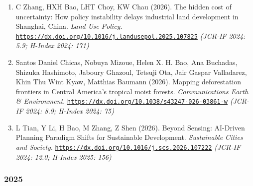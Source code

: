 \documentclass[10pt,a4paper]{article}
\begin{document}
\begin{enumerate}
  the Yangtze River Delta. \emph{Journal of Transport Geography}.
  \href{https://dx.doi.org/10.1016/j.jtrangeo.2026.104713}{\nolinkurl{https://dx.doi.org/10.1016/j.jtrangeo.2026.104713}}
  \emph{(JCR-IF 2024: 6.3; H-Index 2024: 165)}
\item
  C Zhang, HXH Bao, LHT Choy, KW Chau (2026). The hidden cost of
  uncertainty: How policy instability delays industrial land development
  in Shanghai, China. \emph{Land Use Policy}.
  \href{https://dx.doi.org/10.1016/j.landusepol.2025.107825}{\nolinkurl{https://dx.doi.org/10.1016/j.landusepol.2025.107825}}
  \emph{(JCR-IF 2024: 5.9; H-Index 2024: 171)}
\item
  Santos Daniel Chicas, Nobuya Mizoue, Helen X. H. Bao, Ana Buchadas,
  Shizuka Hashimoto, Jaboury Ghazoul, Tetsuji Ota, Jair Gaspar
  Valladarez, Khin Thu Wint Kyaw, Matthias Baumann (2026). Mapping
  deforestation frontiers in Central America's tropical moist forests.
  \emph{Communications Earth \& Environment}.
  \href{https://dx.doi.org/10.1038/s43247-026-03861-w}{\nolinkurl{https://dx.doi.org/10.1038/s43247-026-03861-w}}
  \emph{(JCR-IF 2024: 8.9; H-Index 2024: 75)}
\item
  L Tian, Y Li, H Bao, M Zhang, Z Shen (2026). Beyond Sensing: AI-Driven
  Planning Paradigm Shifts for Sustainable Development.
  \emph{Sustainable Cities and Society}.
  \href{https://dx.doi.org/10.1016/j.scs.2026.107222}{\nolinkurl{https://dx.doi.org/10.1016/j.scs.2026.107222}}
  \emph{(JCR-IF 2024: 12.0; H-Index 2025: 156)}
\end{enumerate}

\subsubsection{2025}\label{section-1}
\end{document}

